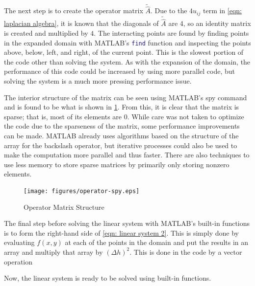 \documentclass[10pt,a4paper]{article}
\begin{document}
The next step is to create the operator matrix $\tilde{\hat{A}}$. Due to the $4u_{ij}$ term in \cref{eqn: laplacian algebra}, it is known that the diagonals of $\tilde{\hat{A}}$ are 4, so an identity matrix is created and multiplied by $4$. The interacting points are found by finding points in the expanded domain with MATLAB's \lstinline[language=Matlab]|find| function and inspecting the points above, below, left, and right, of the current point. This is the slowest portion of the code other than solving the system. As with the expansion of the domain, the performance of this code could be increased by using more parallel code, but solving the system is a much more pressing performance issue.




The interior structure of the matrix can be seen using MATLAB's spy command and is found to be what is shown in \cref{fig: operator matrix}. From this, it is clear that the matrix is sparse; that is, most of its elements are 0. While care was not taken to optimize the code due to the sparseness of the matrix, some performance improvements can be made. MATLAB already uses algorithms based on the structure of the array for the backslash operator, but iterative processes could also be used to make the computation more parallel and thus faster. There are also techniques to use less memory to store sparse matrices by primarily only storing nonzero elements.

\begin{figure}[H]
\center
\texttt{[image: figures/operator-spy.eps]}
\caption{Operator Matrix Structure}
\label{fig: operator matrix}
\end{figure}

The final step before solving the linear system with MATLAB's built-in functions is to form the right-hand side of \cref{eqn: linear system 2}. This is simply done by evaluating $f(x,y)$ at each of the  points in the domain and put the results in an array and multiply that array by $\left( \Delta h \right)^2$. This is done in the code by a vector operation



Now, the linear system is ready to be solved using built-in functions.


\end{document}
